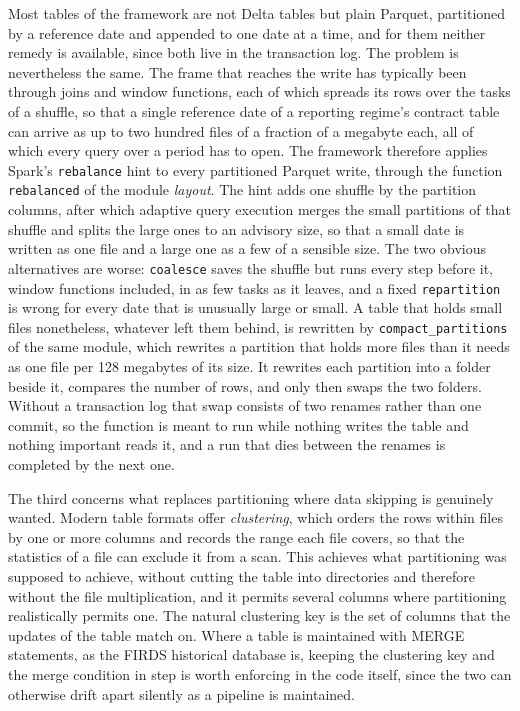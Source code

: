 \documentclass[a4paper, 11pt]{report}
\begin{document}
Most tables of the framework are not Delta tables but plain Parquet, partitioned by a reference date and appended to one date at a time, and for them neither remedy is available, since both live in the transaction log. The problem is nevertheless the same. The frame that reaches the write has typically been through joins and window functions, each of which spreads its rows over the tasks of a shuffle, so that a single reference date of a reporting regime's contract table can arrive as up to two hundred files of a fraction of a megabyte each, all of which every query over a period has to open. The framework therefore applies Spark's \verb|rebalance| hint to every partitioned Parquet write, through the function \verb|rebalanced| of the module \emph{layout}. The hint adds one shuffle by the partition columns, after which adaptive query execution merges the small partitions of that shuffle and splits the large ones to an advisory size, so that a small date is written as one file and a large one as a few of a sensible size. The two obvious alternatives are worse: \verb|coalesce| saves the shuffle but runs every step before it, window functions included, in as few tasks as it leaves, and a fixed \verb|repartition| is wrong for every date that is unusually large or small. A table that holds small files nonetheless, whatever left them behind, is rewritten by \verb|compact_partitions| of the same module, which rewrites a partition that holds more files than it needs as one file per 128 megabytes of its size. It rewrites each partition into a folder beside it, compares the number of rows, and only then swaps the two folders. Without a transaction log that swap consists of two renames rather than one commit, so the function is meant to run while nothing writes the table and nothing important reads it, and a run that dies between the renames is completed by the next one.

The third concerns what replaces partitioning where data skipping is genuinely wanted. Modern table formats offer \emph{clustering}, which orders the rows within files by one or more columns and records the range each file covers, so that the statistics of a file can exclude it from a scan. This achieves what partitioning was supposed to achieve, without cutting the table into directories and therefore without the file multiplication, and it permits several columns where partitioning realistically permits one. The natural clustering key is the set of columns that the updates of the table match on. Where a table is maintained with MERGE statements, as the FIRDS historical database is, keeping the clustering key and the merge condition in step is worth enforcing in the code itself, since the two can otherwise drift apart silently as a pipeline is maintained.
\end{document}
